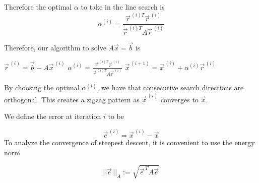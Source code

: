 Therefore the optimal $\alpha$ to take in the line search is
\begin{equation*}
    \alpha^{(i)} = \frac{\vec{r}^{\,(i)T}\vec{r}^{\,(i)}}{\vec{r}^{\,(i)T}A\vec{r}^{\,(i)}}
\end{equation*}

Therefore, our algorithm to solve $A\vec{x}=\vec{b}$ is


\begin{algorithmic}
    \STATE $\vec{r}^{\,(i)} = \vec{b} - A\vec{x}^{\,(i)}$
    \STATE $    \alpha^{(i)} = \frac{\vec{r}^{\,(i)T}\vec{r}^{\,(i)}}{\vec{r}^{\,(i)T}A\vec{r}^{\,(i)}} $
    \STATE $\vec{x}^{\,(i+1)} = \vec{x}^{\,(i)} + \alpha^{(i)}\vec{r}^{\,(i)}$
    \ENDFOR
\end{algorithmic}

By choosing the optimal $\alpha^{(i)}$, we have that consecutive search directions are orthogonal. This creates a zigzag pattern as $\vec{x}^{\,(i)}$ converges to $\vec{x}$.


\begin{center}
\end{center}


We define the error at iteration $i$ to be

\begin{equation*}
    \vec{e}^{\,(i)} =\vec{x}^{\,(i)} - \vec{x}
\end{equation*}
To analyze the convergence of steepest descent, it is convenient to use the energy norm

\begin{equation*}
    \lvert\lvert \vec{e}\, \rvert\rvert_A :=\sqrt{\vec{e}^{\,T}A\vec{e}}
\end{equation*}

